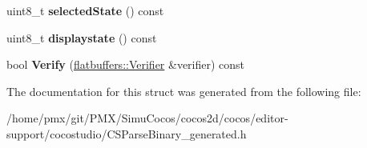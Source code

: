 \begin{DoxyCompactItemize}
\mbox{\label{structflatbuffers_1_1CheckBoxOptions_a99762dc65094e4ab00bce250737a898a}} 
uint8\+\_\+t {\bfseries selected\+State} () const
\item 
\mbox{\label{structflatbuffers_1_1CheckBoxOptions_a1bcdda41377cda24413151368eed426c}} 
uint8\+\_\+t {\bfseries displaystate} () const
\item 
\mbox{\label{structflatbuffers_1_1CheckBoxOptions_a2acb2f4f31b59e4acaf6de2bcebefe99}} 
bool {\bfseries Verify} (\hyperlink{classflatbuffers_1_1Verifier}{flatbuffers\+::\+Verifier} \&verifier) const
\end{DoxyCompactItemize}


The documentation for this struct was generated from the following file\+:\begin{DoxyCompactItemize}
\item 
/home/pmx/git/\+P\+M\+X/\+Simu\+Cocos/cocos2d/cocos/editor-\/support/cocostudio/C\+S\+Parse\+Binary\+\_\+generated.\+h\end{DoxyCompactItemize}
